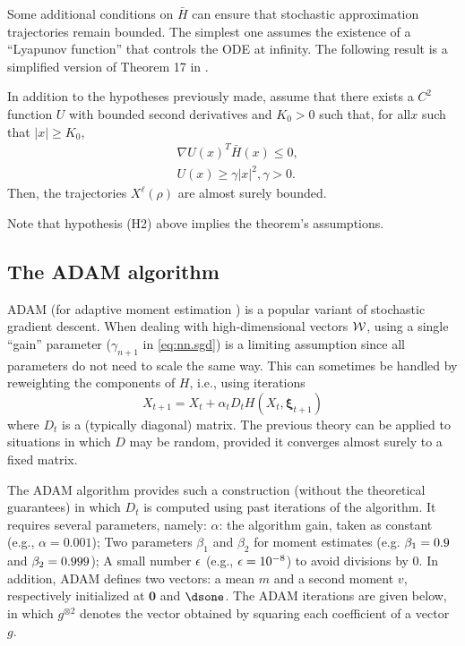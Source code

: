 Some additional conditions on $\bar H$ can ensure that stochastic approximation trajectories remain bounded. The simplest one assumes the existence of a ``Lyapunov function'' that controls the ODE at infinity. The following result is a simplified version of Theorem 17 in \citet{benveniste2012adaptive}.
\begin{theorem}
\label{th:sgd.lyap}
In addition to the hypotheses previously made, 
assume that there exists a $C^2$ function $U$ with bounded second derivatives and $K_0 >0$ such that, for all$x$ such that  $|x| \geq K_0$, 
\begin{align*}
&\nabla U(x)^T\bar H(x) \leq 0,\\
&U(x) \geq \gamma |x|^2, \gamma>0.
\end{align*}
Then, the trajectories $X^\ell(\rho)$ are almost surely bounded.
\end{theorem}
Note that hypothesis (H2) above implies the theorem's assumptions. 


\subsection{The ADAM algorithm}
\label{sec:adam}
ADAM (for adaptive moment estimation \citep{kingma2014adam}) is a popular variant of stochastic gradient descent.
 When dealing with high-dimensional vectors ${\mathcal W}$, using a single ``gain'' parameter ($\gamma_{n+1}$ in \cref{eq:nn.sgd}) is a limiting assumption since all parameters do not need to scale the same way. This can sometimes be handled by reweighting the components of $H$, i.e., using iterations
 \[
 X_{t+1} = X_t + \alpha_t D_t H(X_t, \boldsymbol\xi_{t+1})
 \]
 where $D_t$ is a (typically diagonal) matrix. The previous theory can be applied to situations in which $D$ may be random, provided it converges almost surely to a fixed matrix.
 
 
The ADAM algorithm provides such a construction (without the theoretical guarantees) in which $D_t$ is computed using past iterations of the algorithm. It requires several parameters, namely: $\alpha$: the algorithm gain, taken as constant (e.g., $\alpha=0.001$);
Two parameters $\beta_1$ and $\beta_2$ for moment estimates (e.g. $\beta_1 = 0.9$ and $\beta_2=0.999$);
A small number $\epsilon$ (e.g., $\epsilon = 10^{-8}$) to avoid divisions by 0.
In addition, ADAM defines two vectors: a mean $m$ and a second moment $v$, respectively initialized at $\boldsymbol 0$ and $\dsone$. The ADAM iterations are given below, in which $g^{\otimes 2}$ denotes the vector obtained by squaring each coefficient of a vector $g$.

